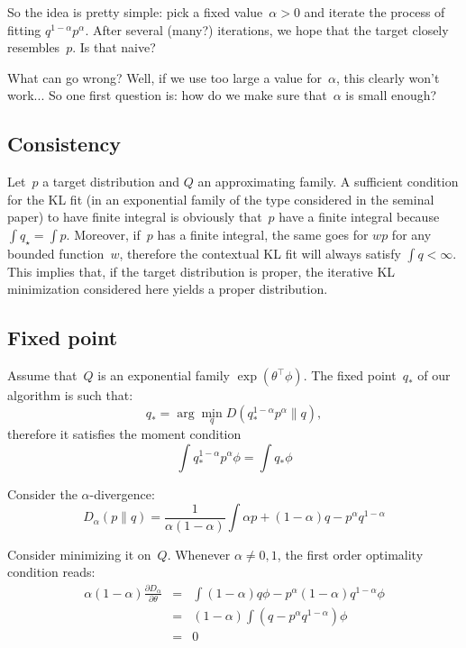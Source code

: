 \documentclass{article}
\begin{document}

So the idea is pretty simple: pick a fixed value~$\alpha>0$ and iterate the process of fitting $q^{1-\alpha}p^\alpha$. After several (many?) iterations, we hope that the target closely resembles~$p$. Is that naive? 

What can go wrong? Well, if we use too large a value for~$\alpha$, this clearly won't work... So one first question is: how do we make sure that~$\alpha$ is small enough? 

\subsection{Consistency}

Let~$p$ a target distribution and $Q$ an approximating family. A sufficient condition for the KL fit (in an exponential family of the type considered in the seminal paper) to have finite integral is obviously that~$p$ have a finite integral because $\int q_\star = \int p$. Moreover, if~$p$ has a finite integral, the same goes for $wp$ for any bounded function~$w$, therefore the contextual KL fit will always satisfy $\int q < \infty$. This implies that, if the target distribution is proper, the iterative KL minimization considered here yields a proper distribution.

\subsection{Fixed point}

Assume that~$Q$ is an exponential family $\exp(\theta^\top \phi)$. The fixed point~$q_*$ of our algorithm is such that:
$$
q_* = \arg\min_q D(q_*^{1-\alpha} p^\alpha \| q),
$$
therefore it satisfies the moment condition
$$
\int q_*^{1-\alpha}p^\alpha\phi 
= \int q_* \phi
$$

Consider the $\alpha$-divergence:
$$
D_\alpha(p\|q) = 
\frac{1}{\alpha(1-\alpha)}
\int \alpha p + (1-\alpha) q - p^\alpha q^{1-\alpha} 
$$

Consider minimizing it on~$Q$. Whenever $\alpha\not=0,1$, the first order optimality condition reads:
\begin{eqnarray*}
\alpha(1-\alpha) \frac{\partial D_\alpha}{\partial \theta} 
& = & \int (1-\alpha) q \phi - p^\alpha (1-\alpha) q^{1-\alpha} \phi \\
& = & (1-\alpha) \int (q - p^\alpha q^{1-\alpha}) \phi \\
& = & 0
\end{eqnarray*}
\end{document}
